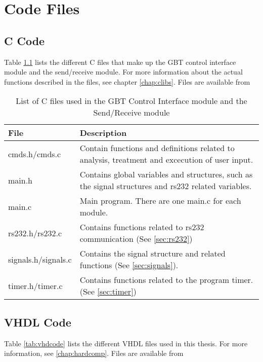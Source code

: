 \documentclass[main.tex]{subfiles}
\begin{document}
\chapter{Code Files}

\section{C Code}

Table \ref{tab:ccode} lists the different C files that make up the GBT control interface module and the send/receive module. For more information about the actual functions described in the files, see chapter \ref{chap:clibs}. Files are available from 

\begin{table}[H]
\centering
\caption{List of C files used in the GBT Control Interface module and the Send/Receive module}
\label{tab:ccode}
\begin{tabular}{l p{8cm}}
\hline
 File & Description \\ \hline
 cmds.h/cmds.c & Contain functions and definitions related to analysis, treatment and excecution of user input.\\ %
 main.h & Contains global variables and structures, such as the signal structures and rs232 related variables. \\ %
 main.c & Main program. There are one main.c for each module.\\ %
 rs232.h/rs232.c & Contains functions related to rs232 communication (See \ref{sec:rs232})\\ %
 signals.h/signals.c & Contains the signal structure and related functions (See \ref{sec:signals}).\\ %
 timer.h/timer.c & Contains functions related to the program timer. (See \ref{sec:timer}) \\ \hline
\end{tabular}
\end{table}

\newpage

\section{VHDL Code}

Table \ref{tab:vhdcode} lists the different VHDL files used in this thesis. For more information, see \ref{chap:hardcomp}. Files are available from 
\end{document}
